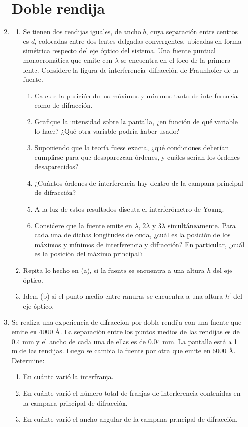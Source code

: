 \documentclass[11pt,spanish,a4paper]{article}
\begin{document}
\begin{enumerate}
\section*{Doble rendija}
\item 
\begin{enumerate}
\item Se tienen dos rendijas iguales, de ancho $b$, cuya separación entre
centros es $d$, colocadas entre dos lentes delgadas convergentes,
ubicadas en forma simétrica respecto del eje óptico del sistema. Una
fuente puntual monocromática que emite con $\lambda$ se encuentra
en el foco de la primera lente. Considere la figura de interferencia--difracción
de Fraunhofer de la fuente. 
\begin{enumerate}
\item Calcule la posición de los máximos y mínimos tanto de interferencia
como de difracción. 
\item Grafique la intensidad sobre la pantalla, ¿en función de qué variable
lo hace? ¿Qué otra variable podría haber usado?
\item Suponiendo que la teoría fuese exacta, ¿qué condiciones deberían cumplirse
para que desaparezcan órdenes, y cuáles serían los órdenes desaparecidos? 
\item ¿Cuántos órdenes de interferencia hay dentro de la campana principal
de difracción?
\item A la luz de estos resultados discuta el interferómetro de Young. 
\item Considere que la fuente emite en $\lambda$, $2\lambda$ y $3\lambda$
simultáneamente. Para cada una de dichas longitudes de onda, ¿cuál
es la posición de los máximos y mínimos de interferencia y difracción?
En particular, ¿cuál es la posición del máximo principal?
\end{enumerate}
\item Repita lo hecho en (a), si la fuente se encuentra a una altura $h$
del eje óptico. 
\item Idem (b) si el punto medio entre ranuras se encuentra a una altura
$h'$ del eje óptico. 
\end{enumerate}


\item Se realiza una experiencia de difracción por doble rendija con una
fuente que emite en 4000 Å. La separación entre los puntos medios
de las rendijas es de $0.4$ mm y el ancho de cada una de ellas es
de $0.04$ mm. La pantalla está a 1 m de las rendijas. Luego se cambia
la fuente por otra que emite en 6000 Å. Determine:
\begin{enumerate}
\item En cuánto varió la interfranja. 
\item En cuánto varió el número total de franjas de interferencia contenidas
en la campana principal de difracción. 
\item En cuánto varió el ancho angular de la campana principal de difracción. 
\end{enumerate}



\end{enumerate}
\end{document}
